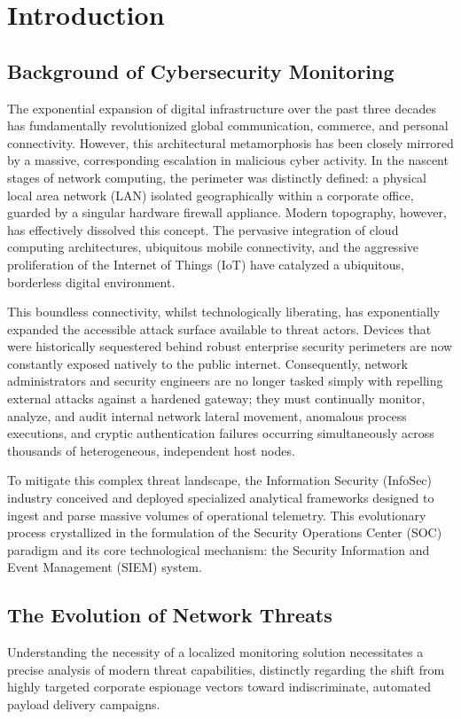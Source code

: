 \chapter{Introduction}

\section{Background of Cybersecurity Monitoring}
The exponential expansion of digital infrastructure over the past three decades has fundamentally revolutionized global communication, commerce, and personal connectivity. However, this architectural metamorphosis has been closely mirrored by a massive, corresponding escalation in malicious cyber activity. In the nascent stages of network computing, the perimeter was distinctly defined: a physical local area network (LAN) isolated geographically within a corporate office, guarded by a singular hardware firewall appliance. Modern topography, however, has effectively dissolved this concept. The pervasive integration of cloud computing architectures, ubiquitous mobile connectivity, and the aggressive proliferation of the Internet of Things (IoT) have catalyzed a ubiquitous, borderless digital environment. 

This boundless connectivity, whilst technologically liberating, has exponentially expanded the accessible attack surface available to threat actors. Devices that were historically sequestered behind robust enterprise security perimeters are now constantly exposed natively to the public internet. Consequently, network administrators and security engineers are no longer tasked simply with repelling external attacks against a hardened gateway; they must continually monitor, analyze, and audit internal network lateral movement, anomalous process executions, and cryptic authentication failures occurring simultaneously across thousands of heterogeneous, independent host nodes.

To mitigate this complex threat landscape, the Information Security (InfoSec) industry conceived and deployed specialized analytical frameworks designed to ingest and parse massive volumes of operational telemetry. This evolutionary process crystallized in the formulation of the Security Operations Center (SOC) paradigm and its core technological mechanism: the Security Information and Event Management (SIEM) system.

\section{The Evolution of Network Threats}
Understanding the necessity of a localized monitoring solution necessitates a precise analysis of modern threat capabilities, distinctly regarding the shift from highly targeted corporate espionage vectors toward indiscriminate, automated payload delivery campaigns.

